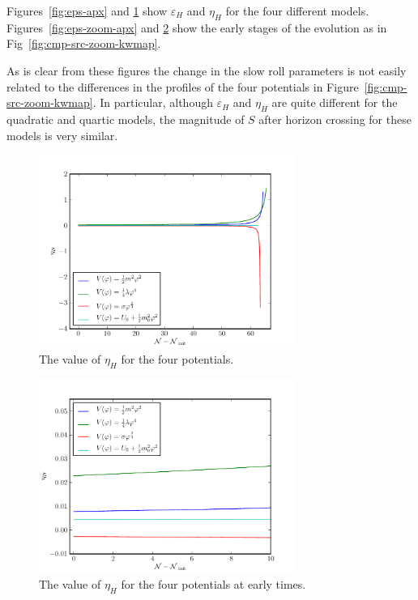 Figures~\ref{fig:eps-apx} and \ref{fig:eta-apx} show $\varepsilon_H$ and $\eta_H$ for the
four different models. Figures~\ref{fig:eps-zoom-apx} and
\ref{fig:eta-zoom-apx} show the early stages of the evolution as in
Fig~\ref{fig:cmp-src-zoom-kwmap}.

As is clear from these figures the change in the slow roll parameters is not easily related
to the differences in the profiles of the four potentials in Figure~\ref{fig:cmp-src-zoom-kwmap}. In
particular, although $\varepsilon_H$ and $\eta_H$ are quite different for the quadratic and quartic
models, the magnitude of $S$ after horizon crossing for these models is very similar.
\begin{figure}
 \centering
 \includegraphics[width=0.75\textwidth]{numerical/graphs/eta_slowroll-large.pdf}
 \caption[Value of $\eta_H$ for the Four Potentials]{The value of $\eta_H$ for the four
potentials.}
 \label{fig:eta-apx}
\end{figure}

\begin{figure}
 \centering
 \includegraphics[width=0.75\textwidth]{numerical/graphs/eta_slowroll_zoom-large.pdf}
 \caption[Value of $\eta_H$ for the Four Potentials at Early Times]{The value of $\eta_H$ for the
four potentials at early times.}
 \label{fig:eta-zoom-apx}
\end{figure}

